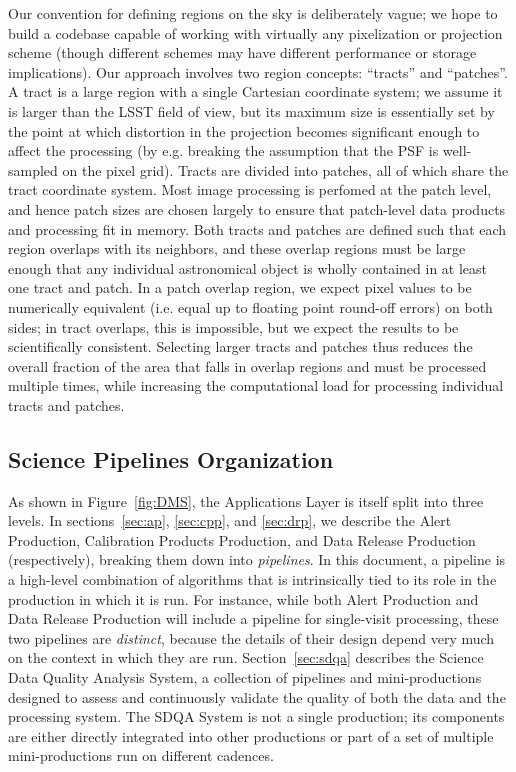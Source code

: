 Our convention for defining regions on the sky is deliberately vague; we hope to build a codebase capable of working with virtually any pixelization or projection scheme (though different schemes may have different performance or storage implications).  Our approach involves two region concepts: ``tracts'' and ``patches''.  A tract is a large region with a single Cartesian coordinate system; we assume it is larger than the LSST field of view, but its maximum size is essentially set by the point at which distortion in the projection becomes significant enough to affect the processing (by e.g. breaking the assumption that the PSF is well-sampled on the pixel grid).  Tracts are divided into patches, all of which share the tract coordinate system.  Most image processing is perfomed at the patch level, and hence patch sizes are chosen largely to ensure that patch-level data products and processing fit in memory.  Both tracts and patches are defined such that each region overlaps with its neighbors, and these overlap regions must be large enough that any individual astronomical object is wholly contained in at least one tract and patch.  In a patch overlap region, we expect pixel values to be numerically equivalent (i.e. equal up to floating point round-off errors) on both sides; in tract overlaps, this is impossible, but we expect the results to be scientifically consistent.  Selecting larger tracts and patches thus reduces the overall fraction of the area that falls in overlap regions and must be processed multiple times, while increasing the computational load for processing individual tracts and patches.

\subsection{Science Pipelines Organization}

As shown in Figure~\ref{fig:DMS}, the Applications Layer is itself split into three levels.  In sections~\ref{sec:ap}, \ref{sec:cpp}, and \ref{sec:drp}, we describe the Alert Production, Calibration Products Production, and Data Release Production (respectively), breaking them down into \emph{pipelines}.  In this document, a pipeline is a high-level combination of algorithms that is intrinsically tied to its role in the production in which it is run.  For instance, while both Alert Production and Data Release Production will include a pipeline for single-visit processing, these two pipelines are \emph{distinct}, because the details of their design depend very much on the context in which they are run.  Section~\ref{sec:sdqa} describes the Science Data Quality Analysis System, a collection of pipelines and mini-productions designed to assess and continuously validate the quality of both the data and the processing system.  The SDQA System is not a single production; its components are either directly integrated into other productions or part of a set of multiple mini-productions run on different cadences.

